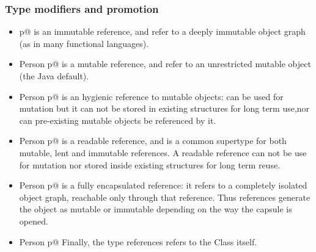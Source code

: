 \begin{frame}[fragile]
\frametitle{Type modifiers and promotion}
\begin{Scaled}{0.9}{0.9}
\!\!\!\!
\parbox{67ex}{
\begin{itemize}
\item \Q@Person p@ is an immutable reference, and refer to a deeply immutable object graph (as in many functional languages).

\item \Q@mut Person p@ is a mutable reference, and refer to an unrestricted mutable object (the Java default).

\item \Q@lent Person p@ is an hygienic reference to mutable objects: can be used 
for mutation but it can not be stored in existing structures for long term use,nor
 can pre-existing mutable objects be referenced by it.

\item \Q@read Person p@ is a readable reference, and is a common supertype for both mutable, lent and immutable references.
A readable reference can not be use for mutation nor stored inside existing structures for long term reuse.

\item \Q@capsule Person p@ is a fully encapsulated reference: it refers to
 a completely isolated object graph, reachable only through that reference.
 Thus \Q@capsule@ references generate the object as mutable or
 immutable depending on the way the capsule is opened.

\item\Q@type Person p@ Finally, the type references refers to the Class itself.
\end{itemize}
}
\end{Scaled}
\end{frame}

